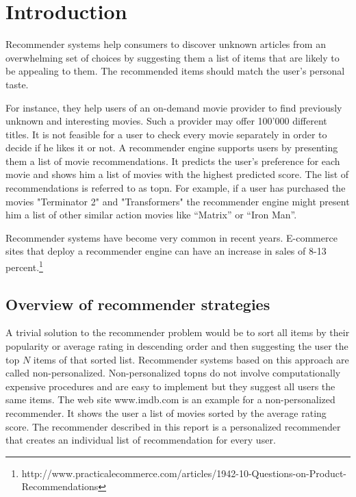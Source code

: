 \section{Introduction}
\label{sec:intro}

Recommender systems help consumers to discover unknown articles from an overwhelming set of choices by suggesting them a list of items that are likely to be appealing to them. The recommended items should match the user's personal taste.

For instance, they help users of an on-demand movie provider to find previously unknown and interesting movies. Such a provider may offer 100'000 different titles. It is not feasible for a user to check every movie separately in order to decide if he likes it or not. A recommender engine supports users by presenting them a list of movie recommendations. It predicts the user's \gls{preference} for each movie and shows him a list of movies with the highest predicted score. The list of recommendations is referred to as \gls{topn}. For example, if a user has purchased the movies "Terminator 2" and "Transformers" the recommender engine might present him a list of other similar action movies like ``Matrix'' or ``Iron Man''. 
 
Recommender systems have become very common in recent years. E-commerce sites that deploy a recommender engine can have an increase in sales of 8-13 percent.\footnote{http://www.practicalecommerce.com/articles/1942-10-Questions-on-Product-Recommendations}

\subsection{Overview of recommender strategies}
\label{sec:strategies}

A trivial solution to the recommender problem would be to sort all items by their popularity or average rating in descending order and then suggesting the user the top $N$ items of that sorted list. Recommender systems based on this approach are called non-personalized. Non-personalized \glspl{topn} do not involve computationally expensive procedures and are easy to implement but they suggest all users the same items. The web site www.imdb.com is an example for a non-personalized recommender. It shows the user a list of movies sorted by the average rating score.
 The recommender described in this report is a personalized recommender that creates an individual list of recommendation for every user.

